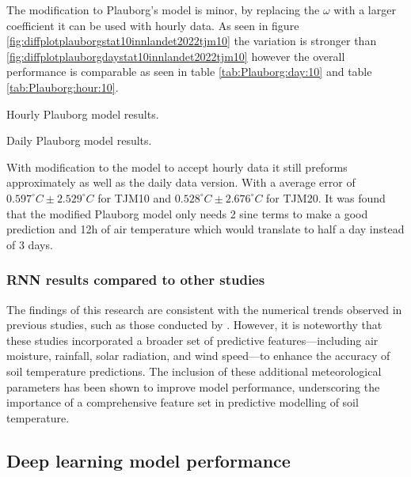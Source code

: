 The modification to Plauborg's model is minor, by replacing the $\omega$ with a larger coefficient it can be used with hourly data. As seen in figure \ref{fig:diffplotplauborgstat10innlandet2022tjm10} the variation is stronger than \ref{fig:diffplotplauborgdaystat10innlandet2022tjm10} however the overall performance is comparable as seen in table \ref{tab:Plauborg:day:10} and table \ref{tab:Plauborg:hour:10}. 

\begin{table}[H]
	\centering
	\resizebox{\textwidth}{!}{
		
	}
	\caption{Hourly Plauborg model results.}
	\label{tab:plauborg_hour_res}
\end{table}

\begin{table}[H]
	\centering
	\resizebox{\textwidth}{!}{
		
	}
	\caption{Daily Plauborg model results.}
	\label{tab:plauborg_day_res}
\end{table}

With modification to the model to accept hourly data it still preforms approximately as well as the daily data version. With a average error of $0.597^\circ C \pm 2.529^\circ C$ for TJM10 and $0.528^\circ C \pm 2.676^\circ C$ for TJM20. It was found that the modified Plauborg model only needs 2 sine terms to make a good prediction and 12h of air temperature which would translate to half a day instead of 3 days.
 
\subsubsection{RNN results compared to other studies}
 
The findings of this research are consistent with the numerical trends observed in previous studies, such as those conducted by \cite{feng_estimation_2019,citakoglu_comparison_2017,li_attention-aware_2022,li_gans-lstm_2020,wang_modeling_2022}. However, it is noteworthy that these studies incorporated a broader set of predictive features—including air moisture, rainfall, solar radiation, and wind speed—to enhance the accuracy of soil temperature predictions. The inclusion of these additional meteorological parameters has been shown to improve model performance, underscoring the importance of a comprehensive feature set in predictive modelling of soil temperature.

\subsection{Deep learning model performance}

